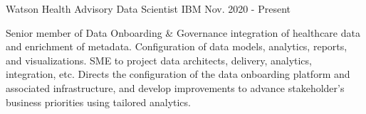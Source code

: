 

\begin{cventries}

  \cventry
    {Watson Health} %
    {Advisory Data Scientist} %
    {IBM} %
    {Nov. 2020 - Present} %
    {
      \begin{cvparagraph}
        Senior member of Data Onboarding \& Governance integration of healthcare data and enrichment of metadata. Configuration of data models, analytics, reports, and visualizations. SME to project data architects, delivery, analytics, integration, etc. Directs the configuration of the data onboarding platform and associated infrastructure, and develop improvements to advance stakeholder’s business priorities using tailored analytics.
      \end{cvparagraph}
    }


\end{cventries}
